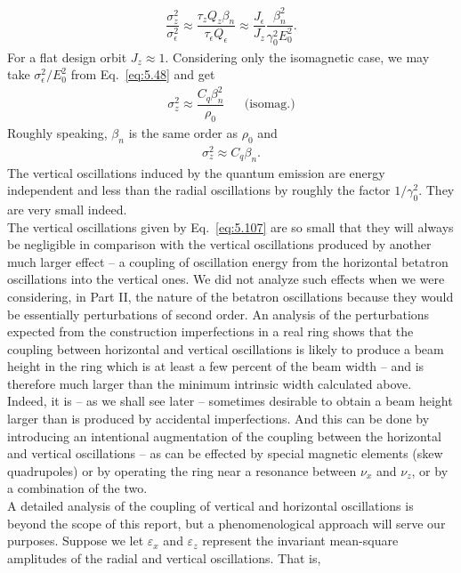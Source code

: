 \begin{align}
	\dfrac{\sigma_z^2}{\sigma_\epsilon^2} \approx \dfrac{\tau_z Q_z \beta_n}{\tau_\epsilon Q_\epsilon} \approx \dfrac{J_\epsilon}{J_z} \dfrac{\beta_n^2}{\gamma_0^2 E_0^2}.
\end{align}
For a flat design orbit $J_z \approx 1$. Considering only the isomagnetic case, we may take $\sigma_\epsilon^2/E_0^2$ from Eq.~\eqref{eq:5.48} and get
\begin{align} \label{eq:5.107}
	\sigma_z^2 \approx \dfrac{C_q \beta_n^2}{\rho_0} && \text{(isomag.)}
\end{align}
Roughly speaking, $\beta_n$ is the same order as $\rho_0$ and
\begin{align}
	\sigma_z^2 \approx C_q \beta_n.
\end{align}
The vertical oscillations induced by the quantum emission are energy independent and less than the radial oscillations by roughly the factor $1/\gamma_0^2$. They are very small indeed.\\
The vertical oscillations given by Eq.~\eqref{eq:5.107} are so small that they will always be negligible in comparison with the vertical oscillations produced by another much larger effect -- a coupling of oscillation energy from the horizontal betatron oscillations into the vertical
 ones. We did not analyze such effects when we were considering, in Part II, the nature of the betatron oscillations because they would be essentially perturbations of second order. An analysis of the perturbations expected from the construction imperfections in a real ring shows that the coupling between horizontal and vertical oscillations is likely to produce a beam height in the ring which is at least a few percent of the beam width -- and is therefore much larger than the minimum intrinsic width calculated above.\\
Indeed, it is -- as we shall see later -- sometimes desirable to obtain a beam height larger than is produced by accidental imperfections. And this can be done by introducing an intentional
 augmentation of the coupling between the horizontal and vertical oscillations -- as can be effected by special magnetic elements (skew quadrupoles) or by operating the ring near a resonance between $\nu_x$ and $\nu_z$, or by a combination of the two.\\
A detailed analysis of the coupling of vertical and horizontal oscillations is beyond the scope of this report, but a phenomenological approach will serve our purposes. Suppose we let $\varepsilon_x$ and $\varepsilon_z$ represent the invariant mean-square amplitudes of the radial and vertical oscillations. That is,
